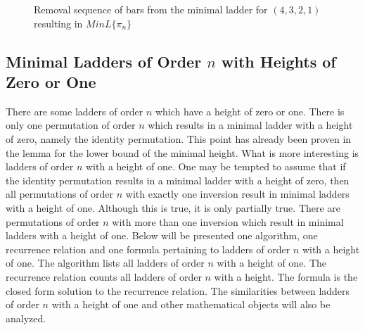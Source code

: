 \begin{figure}[!htp]

         \caption{Removal sequence of bars from the minimal ladder for $(4,3,2,1)$ resulting in $MinL\{\pi_{n}\}$}
        \label{Fig:RemovalSequence}
        \end{figure}
       


   \subsection{Minimal Ladders of Order $n$ with Heights of Zero or One}
   There are some ladders of order $n$ which have a height of zero or one.
   There is only one permutation of order $n$ which results in a minimal ladder with a height of zero, 
   namely the identity permutation. This point has already been proven in the lemma for the lower bound of the 
   minimal height. What is more interesting is ladders of order $n$ with a height of one. 
   One may be tempted to assume that if the identity permutation results in a minimal ladder 
   with a height of zero, then all permutations of order $n$ with exactly one inversion result in minimal ladders with a height of one.
   Although this is true, it is only partially true. There are permutations of order $n$ with more than one inversion 
   which result in minimal ladders with a height of one. Below will be presented one algorithm, one recurrence relation and one formula pertaining 
   to ladders of order $n$ with a height of one. The algorithm lists all ladders of order $n$ with a height of one. The recurrence relation
   counts all ladders of order $n$ with a height. The formula is the closed 
   form solution to the recurrence relation. The similarities between ladders of order $n$ with a height of one and other mathematical 
   objects will also be analyzed.\par 

